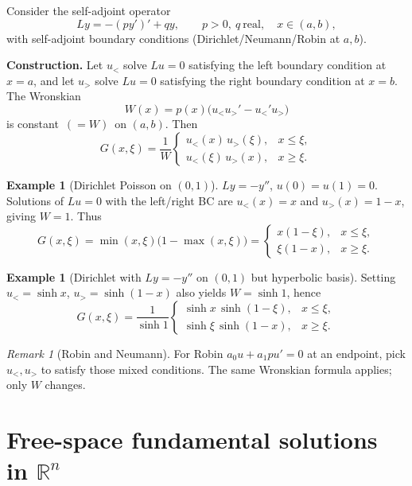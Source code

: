 \documentclass[11pt]{article}
\theoremstyle{definition}
\newtheorem{example}[theorem]{Example}
\theoremstyle{remark}
\newtheorem{remark}[theorem]{Remark}
\newcommand{\R}{\mathbb{R}}
\begin{document}
	Consider the self-adjoint operator
	\[
	Ly=-(p y')'+q y,\qquad p>0,\ q\ \text{real},\quad x\in(a,b),
	\]
	with self-adjoint boundary conditions (Dirichlet/Neumann/Robin at $a,b$).
	
	\begin{tcolorbox}
		\textbf{Construction.} Let $u_{<}$ solve $Lu=0$ satisfying the left boundary condition at $x=a$,
		and let $u_{>}$ solve $Lu=0$ satisfying the right boundary condition at $x=b$.
		The Wronskian
		\[
		W(x)=p(x)\big(u_{<}u_{>}'-u_{<}'u_{>}\big)
		\]
		is constant $\,(=W)\,$ on $(a,b)$. Then
		\[
		G(x,\xi)=\frac{1}{W}\begin{cases}
			u_{<}(x)\,u_{>}(\xi), & x\le \xi,\\[2pt]
			u_{<}(\xi)\,u_{>}(x), & x\ge \xi.
		\end{cases}
		\]
	\end{tcolorbox}
	
	\begin{example}[Dirichlet Poisson on $(0,1)$]
		$Ly=-y''$, $u(0)=u(1)=0$. Solutions of $Lu=0$ with the left/right BC are $u_{<}(x)=x$ and
		$u_{>}(x)=1-x$, giving $W=1$. Thus
		\[
		G(x,\xi)=\min(x,\xi)\big(1-\max(x,\xi)\big)
		=\begin{cases}x(1-\xi),&x\le\xi,\\ \xi(1-x),&x\ge\xi.\end{cases}
		\]
	\end{example}
	
	\begin{example}[Dirichlet with $Ly=-y''$ on $(0,1)$ but hyperbolic basis]
		Setting $u_{<}=\sinh x$, $u_{>}=\sinh(1-x)$ also yields $W=\sinh 1$, hence
		\[
		G(x,\xi)=\frac{1}{\sinh 1}\begin{cases}
			\sinh x\,\sinh(1-\xi),&x\le \xi,\\
			\sinh \xi\,\sinh(1-x),&x\ge \xi.
		\end{cases}
		\]
	\end{example}
	
	\begin{remark}[Robin and Neumann]
		For Robin $a_0 u + a_1 p u' = 0$ at an endpoint, pick $u_{<},u_{>}$ to satisfy those mixed
		conditions. The same Wronskian formula applies; only $W$ changes.
	\end{remark}
	
	\section{Free-space fundamental solutions in $\R^n$}
	
\end{document}
